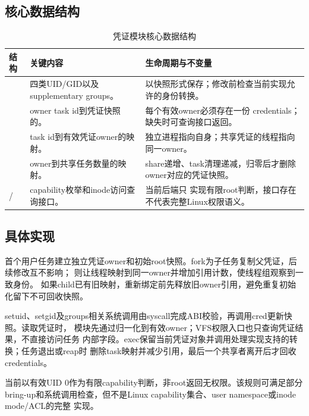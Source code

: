\subsection{核心数据结构}

\begin{table}[htbp]
  \centering
  \caption{凭证模块核心数据结构}
  \label{tab:cred-structures}
  \begin{tabularx}{\textwidth}{L{3.5cm}L{4.9cm}Y}
    \toprule
    结构 & 关键内容 & 生命周期与不变量 \\
    \midrule
     & 四类UID/GID以及supplementary groups。 &
    以快照形式保存；修改前检查当前实现允许的身份转换。\\
     & owner task id到凭证快照的。 & 每个有效owner必须存在一份
    credentials；缺失时可查询接口返回。\\
     & task id到有效凭证owner的映射。 & 独立进程指向自身；共享凭证的线程指向
    同一owner。\\
     & owner到共享任务数量的映射。 & share递增、task清理递减，归零后才删除
    owner对应的凭证快照。\\
     & capability枚举和inode访问查询接口。 & 当前后端只
    实现有限root判断，接口存在不代表完整Linux权限语义。\\
    \bottomrule
  \end{tabularx}
\end{table}

\subsection{具体实现}

首个用户任务建立独立凭证owner和初始root快照。fork为子任务复制父凭证，后续修改互不影响；
则让线程映射到同一owner并增加引用计数，使线程组观察到一致身份。
如果child已有旧映射，重新绑定前先释放旧owner引用，避免重复初始化留下不可回收快照。

setuid、setgid及groups相关系统调用由syscall完成ABI校验，再调用cred更新快照。读取凭证时，
模块先通过归一化到有效owner；VFS权限入口也只查询凭证结果，不直接访问任务
内部字段。exec保留当前凭证对象并调用处理实现支持的转换；任务退出或reap时
删除task映射并减少引用，最后一个共享者离开后才回收credentials。

当前以有效UID 0作为有限capability判断，非root返回无权限。该规则可满足部分
bring-up和系统调用检查，但不是Linux capability集合、user namespace或inode mode/ACL的完整
实现。

